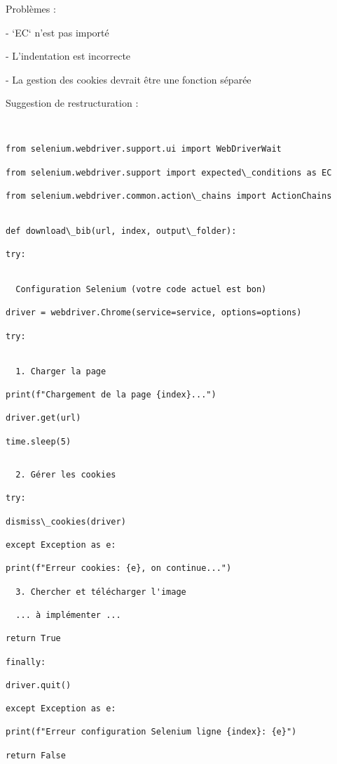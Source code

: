 Problèmes :

- `EC` n'est pas importé

- L'indentation est incorrecte

- La gestion des cookies devrait être une fonction séparée

Suggestion de restructuration :

\begin{verbatim}


from selenium.webdriver.support.ui import WebDriverWait

from selenium.webdriver.support import expected\_conditions as EC

from selenium.webdriver.common.action\_chains import ActionChains


def download\_bib(url, index, output\_folder):

try:


  Configuration Selenium (votre code actuel est bon)

driver = webdriver.Chrome(service=service, options=options)

try:


  1. Charger la page

print(f"Chargement de la page {index}...")

driver.get(url)

time.sleep(5)

\end{verbatim}

\begin{verbatim}

  2. Gérer les cookies

try:

dismiss\_cookies(driver)

except Exception as e:

print(f"Erreur cookies: {e}, on continue...")

  3. Chercher et télécharger l'image

  ... à implémenter ...

return True

finally:

driver.quit()

except Exception as e:

print(f"Erreur configuration Selenium ligne {index}: {e}")

return False

\end{verbatim}

